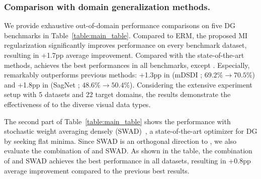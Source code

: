 \subsubsection{Comparison with domain generalization methods.}
We provide exhaustive out-of-domain performance comparisons on five DG benchmarks in Table~\ref{table:main_table}. 
Compared to ERM, the proposed MI regularization significantly improves performance on every benchmark dataset, resulting in +1.7pp average improvement. 
Compared with the state-of-the-art methods, \method{} achieves the best performances in all benchmarks, except \pacs. 
Especially, \method{} remarkably outperforms previous methods: +1.3pp in \oh{} (mDSDI \cite{bui2021mdsdi}; $69.2\% \rightarrow 70.5\%$) and +1.8pp in \tr{} (SagNet \cite{nam2019sagnet}; $48.6\% \rightarrow 50.4\%$).
Considering the extensive experiment setup with 5 datasets and 22 target domains, the results demonstrate the effectiveness of \method{} to the diverse visual data types.

The second part of Table~\ref{table:main_table} shows the performance with stochastic weight averaging densely (SWAD)~\cite{cha2021swad}, a state-of-the-art optimizer for DG by seeking flat minima. Since SWAD is an orthogonal direction to \method{}, we also evaluate the combination of \method{} and SWAD.
As shown in the table, the combination of \method{} and SWAD achieves the best performance in all datasets, resulting in +0.8pp average improvement compared to the previous best results. 



